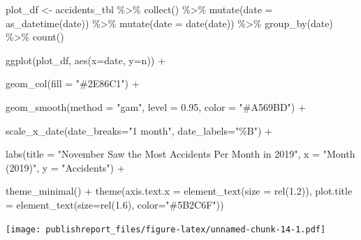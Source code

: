 \documentclass[
]{article}
\newenvironment{Shaded}{\begin{snugshade}}{\end{snugshade}}
\newcommand{\AttributeTok}[1]{\textcolor[rgb]{0.77,0.63,0.00}{#1}}
\newcommand{\FloatTok}[1]{\textcolor[rgb]{0.00,0.00,0.81}{#1}}
\newcommand{\FunctionTok}[1]{\textcolor[rgb]{0.00,0.00,0.00}{#1}}
\newcommand{\NormalTok}[1]{#1}
\newcommand{\OtherTok}[1]{\textcolor[rgb]{0.56,0.35,0.01}{#1}}
\newcommand{\SpecialCharTok}[1]{\textcolor[rgb]{0.00,0.00,0.00}{#1}}
\newcommand{\StringTok}[1]{\textcolor[rgb]{0.31,0.60,0.02}{#1}}
\begin{document}
\begin{Shaded}
\begin{Highlighting}[]
\NormalTok{plot\_df }\OtherTok{\textless{}{-}}\NormalTok{ accidents\_tbl }\SpecialCharTok{\%\textgreater{}\%} 
    \FunctionTok{collect}\NormalTok{() }\SpecialCharTok{\%\textgreater{}\%} 
    \FunctionTok{mutate}\NormalTok{(}\AttributeTok{date =} \FunctionTok{as\_datetime}\NormalTok{(date)) }\SpecialCharTok{\%\textgreater{}\%}
    \FunctionTok{mutate}\NormalTok{(}\AttributeTok{date =} \FunctionTok{date}\NormalTok{(date)) }\SpecialCharTok{\%\textgreater{}\%}
    \FunctionTok{group\_by}\NormalTok{(date) }\SpecialCharTok{\%\textgreater{}\%}
    \FunctionTok{count}\NormalTok{()}
  
  \FunctionTok{ggplot}\NormalTok{(plot\_df, }\FunctionTok{aes}\NormalTok{(}\AttributeTok{x=}\NormalTok{date, }\AttributeTok{y=}\NormalTok{n)) }\SpecialCharTok{+}
    
    \FunctionTok{geom\_col}\NormalTok{(}\AttributeTok{fill =} \StringTok{"\#2E86C1"}\NormalTok{) }\SpecialCharTok{+}
    
    \FunctionTok{geom\_smooth}\NormalTok{(}\AttributeTok{method =} \StringTok{"gam"}\NormalTok{, }\AttributeTok{level =} \FloatTok{0.95}\NormalTok{, }\AttributeTok{color =} \StringTok{"\#A569BD"}\NormalTok{) }\SpecialCharTok{+}
    
    \FunctionTok{scale\_x\_date}\NormalTok{(}\AttributeTok{date\_breaks=}\StringTok{"1 month"}\NormalTok{, }\AttributeTok{date\_labels=}\StringTok{"\%B"}\NormalTok{) }\SpecialCharTok{+}
    
    \FunctionTok{labs}\NormalTok{(}\AttributeTok{title =} \StringTok{"November Saw the Most Accidents Per Month in 2019"}\NormalTok{,}
         \AttributeTok{x =} \StringTok{"Month (2019)"}\NormalTok{,}
         \AttributeTok{y =} \StringTok{"Accidents"}\NormalTok{) }\SpecialCharTok{+}
    
    \FunctionTok{theme\_minimal}\NormalTok{() }\SpecialCharTok{+}
    \FunctionTok{theme}\NormalTok{(}\AttributeTok{axis.text.x =} \FunctionTok{element\_text}\NormalTok{(}\AttributeTok{size =} \FunctionTok{rel}\NormalTok{(}\FloatTok{1.2}\NormalTok{)),}
          \AttributeTok{plot.title =} \FunctionTok{element\_text}\NormalTok{(}\AttributeTok{size=}\FunctionTok{rel}\NormalTok{(}\FloatTok{1.6}\NormalTok{), }\AttributeTok{color=}\StringTok{"\#5B2C6F"}\NormalTok{))}
\end{Highlighting}
\end{Shaded}

\texttt{[image: publishreport\_files/figure-latex/unnamed-chunk-14-1.pdf]}
\end{document}
